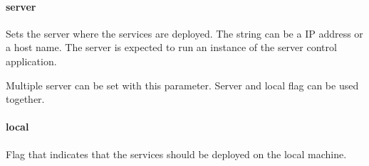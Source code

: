 \paragraph{server}


Sets the server where the services are deployed. The string can be a IP address
or a host name. The server is expected to run an instance of the server control
application.

Multiple server can be set with this parameter. Server and local flag can be
used together.

\paragraph{local}


Flag that indicates that the services should be deployed on the local machine.
